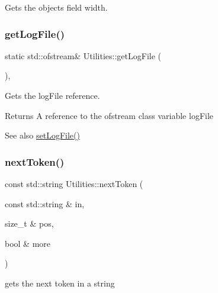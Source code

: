 Gets the objects field width. 

\mbox{\label{class_utilities_aecd7de50b27a709a9810b17940074cad}} 
\subsubsection{\texorpdfstring{get\+Log\+File()}{getLogFile()}}
{\footnotesize\ttfamily static std\+::ofstream\& Utilities\+::get\+Log\+File (\begin{DoxyParamCaption}{ }\end{DoxyParamCaption})\hspace{0.3cm}{\ttfamily [inline]}, {\ttfamily [static]}}



Gets the log\+File reference. 

\begin{DoxyReturn}{Returns}
A reference to the ofstream class variable log\+File 
\end{DoxyReturn}
\begin{DoxySeeAlso}{See also}
\mbox{\hyperlink{class_utilities_a4d03fd38f07e567277b82b8a0e030245}{set\+Log\+File()}} 
\end{DoxySeeAlso}
\mbox{\label{class_utilities_a59c27deae1e3810d8591b35ed90b7f33}} 
\subsubsection{\texorpdfstring{next\+Token()}{nextToken()}}
{\footnotesize\ttfamily const std\+::string Utilities\+::next\+Token (\begin{DoxyParamCaption}\item[{const std\+::string \&}]{in,  }\item[{size\+\_\+t \&}]{pos,  }\item[{bool \&}]{more }\end{DoxyParamCaption})}



gets the next token in a string 

